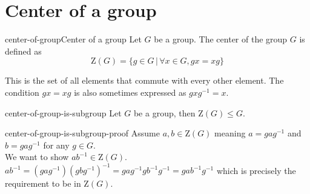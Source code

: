 \documentclass[preview]{standalone}
\begin{document}
\section{Center of a group}

\begin{snippetdefinition}{center-of-group}{Center of a group}
    Let \(G\) be a group. The center of the group \(G\) is defined as
    \[
        \text{Z}(G) = \{
            g \in G \,|\, \forall x \in G, gx = xg
        \}
    \]

    This is the set of all elements that commute with every other element.
    The condition \(gx=xg\) is also sometimes expressed as \(gxg^{-1} = x\).
\end{snippetdefinition}

\begin{snippettheorem}{center-of-group-is-subgroup}{}
    Let \(G\) be a group, then \(\text{Z}(G) \leq G\).
\end{snippettheorem}

\begin{snippetproof}{center-of-group-is-subgroup-proof}{}
    Assume \(a, b \in \text{Z}(G)\) meaning \(a = gag^{-1}\) and \(b = gag^{-1}\) for any \(g \in G\). \\
    We want to show \(ab^{-1} \in \text{Z}(G)\).
    \(ab^{-1} = (gag^{-1}){(gbg^{-1})}^{-1} = gag^{-1}gb^{-1}g^{-1}
    = g ab^{-1} g^{-1}\) which is precisely the requirement to be in \(\text{Z}(G)\).
\end{snippetproof}

\end{document}
